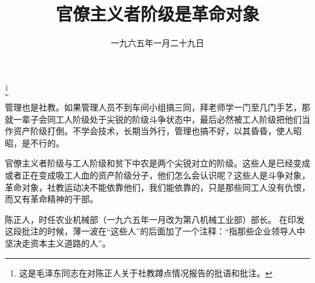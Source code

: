 
\title{官僚主义者阶级是革命对象}
\date{一九六五年一月二十九日}
\thanks{这是毛泽东同志在对陈正人关于社教蹲点情况报告的批语和批注。}
\maketitle


管理也是社教。如果管理人员不到车间小组搞三同，拜老师学一门至几门手艺，那就一辈子会同工人阶级处于尖锐的阶级斗争状态中，最后必然被工人阶级把他们当作资产阶级打倒。不学会技术，长期当外行，管理也搞不好，以其昏昏，使人昭昭，是不行的。

官僚主义者阶级与工人阶级和贫下中农是两个尖锐对立的阶级。这些人是已经变成或者正在变成吸工人血的资产阶级分子，他们怎么会认识呢？这些人是斗争对象，革命对象，社教运动决不能依靠他们，我们能依靠的，只是那些同工人没有仇恨，而又有革命精神的干部。

\begin{maonote}
陈正人，时任农业机械部（一九六五年一月改为第八机械工业部）部长。
在印发这段批注的时候，薄一波在“这些人”的后面加了一个注释：“指那些企业领导人中坚决走资本主义道路的人”。
\end{maonote}
